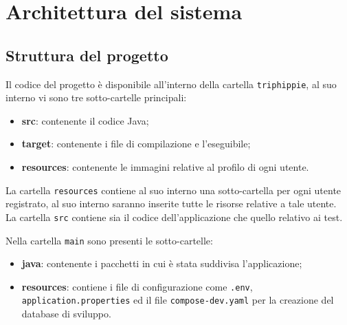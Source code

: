 \newpage
\section{Architettura del sistema}

\subsection{Struttura del progetto}
Il codice del progetto è disponibile all'interno della cartella \texttt{triphippie}, al suo interno vi sono tre sotto-cartelle principali:
\begin{itemize}
    \item \textbf{src}: contenente il codice Java;
    \item \textbf{target}: contenente i file di compilazione e l'eseguibile;
    \item \textbf{resources}: contenente le immagini relative al profilo di ogni utente.
\end{itemize}
La cartella \texttt{resources} contiene al suo interno una sotto-cartella per ogni utente registrato, al suo interno saranno inserite tutte le risorse relative a tale utente.\\
La cartella \texttt{src} contiene sia il codice dell'applicazione che quello relativo ai test.

\begin{figure}[h]
    \centering
    \begin{minipage}{7cm}
    \end{minipage}
\end{figure}

\noindent
Nella cartella \texttt{main} sono presenti le sotto-cartelle:
\begin{itemize}
    \item \textbf{java}: contenente i pacchetti in cui è stata suddivisa l'applicazione;
    \item \textbf{resources}: contiene i file di configurazione come \texttt{.env}, \texttt{application.properties} ed il file \texttt{compose-dev.yaml} per la creazione del database di sviluppo.
\end{itemize} 
\begin{figure}[h]
    \centering
    \begin{minipage}{7cm}
    \end{minipage}
\end{figure}

